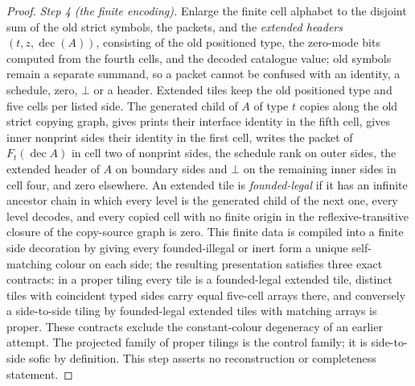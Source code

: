 \documentclass[11pt,a4paper]{article}
\theoremstyle{remark}
\begin{document}
\begin{proof}
\emph{Step 4 (the finite encoding).}  Enlarge the finite cell alphabet to
the disjoint sum of the old strict symbols, the packets, and the
\emph{extended headers} $(t,z,\operatorname{dec}(A))$, consisting of the
old positioned type, the zero-mode bits computed from the fourth cells, and
the decoded catalogue value; old symbols remain a separate summand, so a
packet cannot be confused with an identity, a schedule, zero, $\bot$ or a
header.  Extended tiles keep the old positioned type and five cells per
listed side.  The generated child of $A$ of type $t$ copies along the old
strict copying graph, gives prints their interface identity in the fifth
cell, gives inner nonprint sides their identity in the first cell, writes
the packet of $F_t(\operatorname{dec}A)$ in cell two of nonprint sides, the
schedule rank on outer sides, the extended header of $A$ on boundary sides
and $\bot$ on the remaining inner sides in cell four, and zero elsewhere.
An extended tile is \emph{founded-legal} if it has an infinite ancestor
chain in which every level is the generated child of the next one, every
level decodes, and every copied cell with no finite origin in the
reflexive-transitive closure of the copy-source graph is zero.  This finite
data is compiled into a finite side decoration by giving every
founded-illegal or inert form a unique self-matching colour on each side;
the resulting presentation satisfies three exact contracts: in a proper
tiling every tile is a founded-legal extended tile, distinct tiles with
coincident typed sides carry equal five-cell arrays there, and conversely a
side-to-side tiling by founded-legal extended tiles with matching arrays is
proper.  These contracts exclude the constant-colour degeneracy of an
earlier attempt.  The projected family of proper tilings is the control
family; it is side-to-side sofic by definition.  This step asserts no
reconstruction or completeness statement.


\end{proof}
\end{document}
